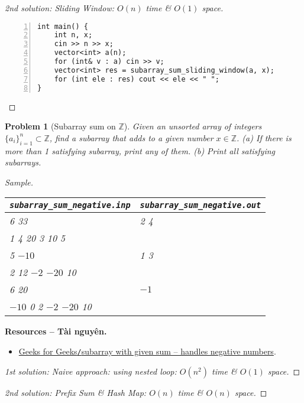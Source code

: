 \documentclass{article}
\newtheorem{problem}{Problem}
\begin{document}
\begin{proof}[2nd solution: Sliding Window: $O(n)$ time \& $O(1)$ space]
\begin{enumerate}
\begin{Verbatim}[numbers=left,xleftmargin=5mm]
int main() {
    int n, x;
    cin >> n >> x;
    vector<int> a(n);
    for (int& v : a) cin >> v;
    vector<int> res = subarray_sum_sliding_window(a, x);
    for (int ele : res) cout << ele << " ";
}
        \end{Verbatim}
    \end{enumerate}
\end{proof}

\begin{problem}[Subarray sum on $\mathbb{Z}$]
    Given an unsorted array of integers $\{a_i\}_{i=1}^n\subset\mathbb{Z}$, find a subarray that adds to a given number $x\in\mathbb{Z}$. (a) If there is more than 1 satisfying subarray, print any of them. (b) Print all satisfying subarrays.
    \item {\sf Sample.}
    \begin{table}[H]
        \centering
        \begin{tabular}{|l|l|}
            \hline
            \verb|subarray_sum_negative.inp| & \verb|subarray_sum_negative.out| \\
            \hline
            6 33 & 2 4 \\
            1 4 20 3 10 5 & \\
            \hline
            5 $-10$ & 1 3 \\
            2 12 $-2$ $-20$ 10 & \\
            \hline
            6 20 & $-1$ \\
            $-10$ 0 2 $-2$ $-20$ 10 & \\
            \hline
        \end{tabular}
    \end{table}
\end{problem}
\noindent\textbf{\textsf{Resources -- Tài nguyên.}}
\begin{itemize}
    \item \href{https://www.geeksforgeeks.org/dsa/find-subarray-with-given-sum-in-array-of-integers/}{Geeks for Geeks{\tt/}subarray with given sum -- handles negative numbers}.
\end{itemize}

\begin{proof}[1st solution: Naive approach: using nested loop: $O(n^2)$ time \& $O(1)$ space]

\end{proof}

\begin{proof}[2nd solution: Prefix Sum \& Hash Map: $O(n)$ time \& $O(n)$ space]

\end{proof}
\end{document}
